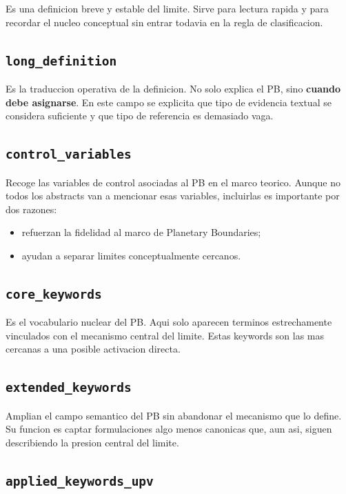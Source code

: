 \documentclass[11pt,a4paper]{article}
\begin{document}
Es una definicion breve y estable del limite. Sirve para lectura rapida y para recordar el nucleo conceptual sin entrar todavia en la regla de clasificacion.

\subsection{\texttt{long\_definition}}

Es la traduccion operativa de la definicion. No solo explica el PB, sino \textbf{cuando debe asignarse}. En este campo se explicita que tipo de evidencia textual se considera suficiente y que tipo de referencia es demasiado vaga.

\subsection{\texttt{control\_variables}}

Recoge las variables de control asociadas al PB en el marco teorico. Aunque no todos los abstracts van a mencionar esas variables, incluirlas es importante por dos razones:

\begin{itemize}
\item refuerzan la fidelidad al marco de Planetary Boundaries;
\item ayudan a separar limites conceptualmente cercanos.
\end{itemize}

\subsection{\texttt{core\_keywords}}

Es el vocabulario nuclear del PB. Aqui solo aparecen terminos estrechamente vinculados con el mecanismo central del limite. Estas keywords son las mas cercanas a una posible activacion directa.

\subsection{\texttt{extended\_keywords}}

Amplian el campo semantico del PB sin abandonar el mecanismo que lo define. Su funcion es captar formulaciones algo menos canonicas que, aun asi, siguen describiendo la presion central del limite.

\subsection{\texttt{applied\_keywords\_upv}}
\end{document}
